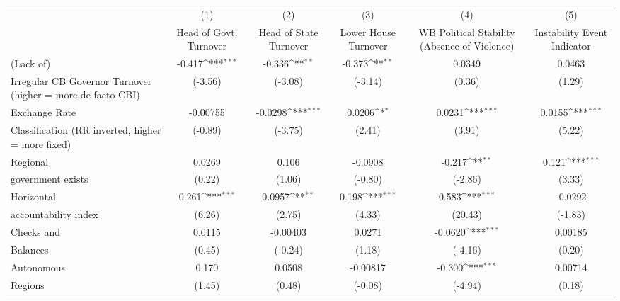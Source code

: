 {
\def\sym#1{\ifmmode^{#1}\else\(^{#1}\)\fi}
\begin{tabular}{l*{5}{c}}
\toprule
                &\multicolumn{1}{c}{(1)}&\multicolumn{1}{c}{(2)}&\multicolumn{1}{c}{(3)}&\multicolumn{1}{c}{(4)}&\multicolumn{1}{c}{(5)}\\
                &\multicolumn{1}{c}{Head of Govt. Turnover}&\multicolumn{1}{c}{Head of State Turnover}&\multicolumn{1}{c}{Lower House Turnover}&\multicolumn{1}{c}{WB Political Stability (Absence of Violence)}&\multicolumn{1}{c}{Instability Event Indicator}\\
\midrule
(Lack of)       &   -0.417\sym{***}&   -0.336\sym{**} &   -0.373\sym{**} &   0.0349         &   0.0463         \\
Irregular CB Governor Turnover (higher = more de facto CBI)&  (-3.56)         &  (-3.08)         &  (-3.14)         &   (0.36)         &   (1.29)         \\
\addlinespace
Exchange Rate   & -0.00755         &  -0.0298\sym{***}&   0.0206\sym{*}  &   0.0231\sym{***}&   0.0155\sym{***}\\
Classification (RR inverted, higher = more fixed)&  (-0.89)         &  (-3.75)         &   (2.41)         &   (3.91)         &   (5.22)         \\
\addlinespace
Regional        &   0.0269         &    0.106         &  -0.0908         &   -0.217\sym{**} &    0.121\sym{***}\\
government exists   &   (0.22)         &   (1.06)         &  (-0.80)         &  (-2.86)         &   (3.33)         \\
\addlinespace
Horizontal      &    0.261\sym{***}&   0.0957\sym{**} &    0.198\sym{***}&    0.583\sym{***}&  -0.0292         \\
accountability index&   (6.26)         &   (2.75)         &   (4.33)         &  (20.43)         &  (-1.83)         \\
\addlinespace
Checks and      &   0.0115         & -0.00403         &   0.0271         &  -0.0620\sym{***}&  0.00185         \\
Balances        &   (0.45)         &  (-0.24)         &   (1.18)         &  (-4.16)         &   (0.20)         \\
\addlinespace
Autonomous      &    0.170         &   0.0508         & -0.00817         &   -0.300\sym{***}&  0.00714         \\
Regions         &   (1.45)         &   (0.48)         &  (-0.08)         &  (-4.94)         &   (0.18)         \\

\end{tabular}}
